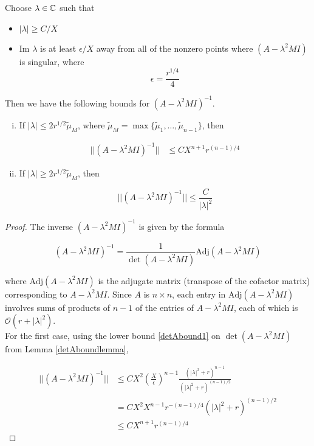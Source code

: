 \documentclass[thesis.tex]{subfiles}
\begin{document}
\begin{lemma}\label{Ainvboundlemma}
Choose $\lambda \in {\mathbb C}$ such that
\begin{itemize}
	\item $|\lambda| \geq C/X$
	\item $\text{Im }\lambda$ is at least $\epsilon/X$ away from all of the nonzero points where $(A - \lambda^2 MI)$ is singular, where
	\[
	\epsilon = \frac{r^{1/4}}{4}
	\]
\end{itemize}

Then we have the following bounds for $(A - \lambda^2 M I)^{-1}$.
\begin{enumerate}[(i)]
\item If $|\lambda| \leq 2 r^{1/2} \tilde{\mu}_M$, where $\tilde{\mu}_M = \max\{\tilde{\mu}_1, \dots, \tilde{\mu}_{n-1}\}$, then

\begin{align}\label{Ainvbound1}
||(A - \lambda^2 M I)^{-1}|| &\leq C X ^{n+1} r^{(n-1)/4}
\end{align}

\item If $|\lambda| \geq 2 r^{1/2} \tilde{\mu}_M$, then

\begin{equation}\label{Ainvbound2}
||(A - \lambda^2 M I)^{-1}|| \leq \frac{C}{|\lambda|^2}
\end{equation}

\end{enumerate}
\begin{proof}
The inverse $(A - \lambda^2 M I)^{-1}$ is given by the formula

\[
(A - \lambda^2 M I)^{-1} = \frac{1}{\det(A - \lambda^2 M I)}\text{Adj}(A - \lambda^2 M I)
\]

where $\text{Adj}(A - \lambda^2 M I)$ is the adjugate matrix (transpose of the cofactor matrix) corresponding to $A - \lambda^2 M I$. Since $A$ is $n \times n$, each entry in $\text{Adj}(A - \lambda^2 M I)$ involves sums of products of $n-1$ of the entries of $A - \lambda^2 M I$, each of which is $\mathcal{O}(r + |\lambda|^2)$. \\

For the first case, using the lower bound \eqref{detAbound1} on $\det(A - \lambda^2 M I)$ from Lemma \ref{detAboundlemma}, 

\begin{align*}
||(A - \lambda^2 M I)^{-1}|| &\leq C X^2 \left(\frac{X}{\epsilon}\right)^{n-1} 
\frac{\left( |\lambda|^2 + r \right)^{n-1}}{\left( |\lambda|^2 + r \right)^{(n-1)/2}} \\
&= C X^2 X^{n - 1} r^{-(n-1)/4}\left( |\lambda|^2 + r \right)^{(n-1)/2} \\
&\leq C X ^{n+1} r^{(n-1)/4}
\end{align*}


\end{proof}
\end{lemma}
\end{document}
